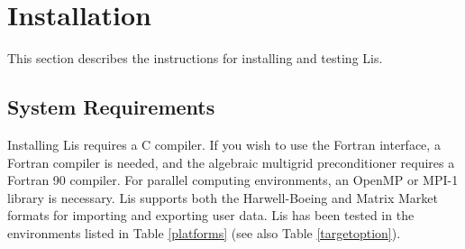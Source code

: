 \documentclass[a4paper]{article}
\begin{document}
\newpage
\section{Installation}
This section describes the instructions for installing and testing Lis. 

\subsection{System Requirements}
Installing Lis requires a C compiler. If you wish to use the Fortran interface,
a Fortran compiler is needed, and the
algebraic multigrid preconditioner requires a Fortran 90 compiler.
For parallel computing environments, an OpenMP\cite{OpenMP} or 
MPI-1\cite{MPI} library is necessary\cite{kota1,kota2}.
Lis supports both the Harwell-Boeing\cite{duff92} and 
Matrix Market\cite{matrixmarket} formats for importing and
exporting user data. 
Lis has been tested in the environments listed in Table \ref{platforms}
(see also Table \ref{targetoption}). 
\end{document}

